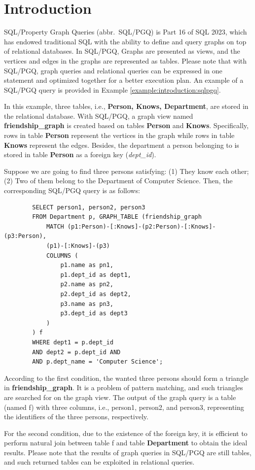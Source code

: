 \section{Introduction}

SQL/Property Graph Queries (abbr.~SQL/PGQ) is Part 16 of SQL 2023, which has endowed traditional SQL with the ability to define and query graphs on top of relational databases.
In SQL/PGQ, Graphs are presented as views, and the vertices and edges in the graphs are represented as tables.
Please note that with SQL/PGQ, graph queries and relational queries can be expressed in one statement and optimized together for a better execution plan.
An example of a SQL/PGQ query is provided in Example \ref{example:introduction:sqlpgq}.

\begin{example}
    \label{example:introduction:sqlpgq}
    In this example, three tables, i.e., \textbf{Person, Knows, Department}, are stored in the relational database.
    With SQL/PGQ, a graph view named \textbf{friendship\_graph} is created based on tables \textbf{Person} and \textbf{Knows}.
    Specifically, rows in table \textbf{Person} represent the vertices in the graph while rows in table \textbf{Knows} represent the edges.
    Besides, the department a person belonging to is stored in table \textbf{Person} as a foreign key (\textit{dept\_id}).

    Suppose we are going to find three persons satisfying: (1) They know each other; (2) Two of them belong to the Department of Computer Science.
    Then, the corresponding SQL/PGQ query is as follows:
    \begin{lstlisting}
        SELECT person1, person2, person3
        FROM Department p, GRAPH_TABLE (friendship_graph
            MATCH (p1:Person)-[:Knows]-(p2:Person)-[:Knows]-(p3:Person),
            (p1)-[:Knows]-(p3)
            COLUMNS (
                p1.name as pn1,
                p1.dept_id as dept1,
                p2.name as pn2,
                p2.dept_id as dept2,
                p3.name as pn3,
                p3.dept_id as dept3
            )
        ) f
        WHERE dept1 = p.dept_id
        AND dept2 = p.dept_id AND
        AND p.dept_name = 'Computer Science';
    \end{lstlisting}
    According to the first condition, the wanted three persons should form a triangle in \textbf{friendship\_graph}.
    It is a problem of pattern matching, and such triangles are searched for on the graph view.
    The output of the graph query is a table (named f) with three columns, i.e., person1, person2, and person3, representing the identifiers of the three persons, respectively.

    For the second condition, due to the existence of the foreign key, it is efficient to perform natural join between table f and table \textbf{Department} to obtain the ideal results.
    Please note that the results of graph queries in SQL/PGQ are still tables, and such returned tables can be exploited in relational queries.
\end{example}

